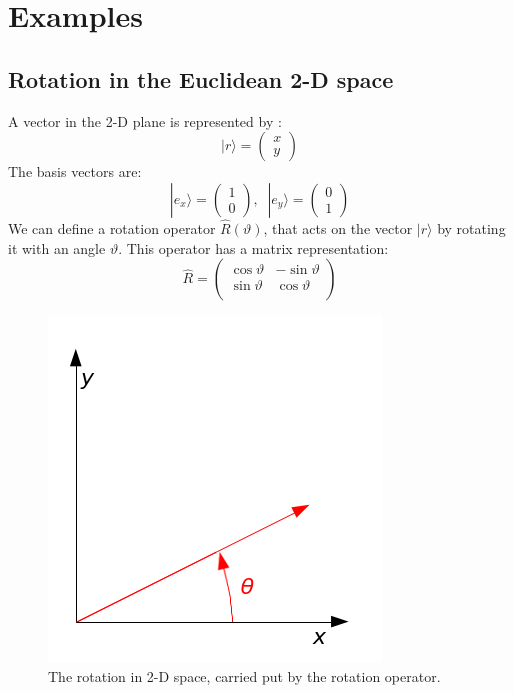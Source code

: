  \section{Examples}
 \subsection{ Rotation in the Euclidean 2-D space} 
 A vector in the 2-D plane is represented by :
 \begin{equation}
 | r \rangle = \left( \begin{array}{c}
 x \\ y
 \end{array}\right) 
 \end{equation}
 The basis vectors are:
 \begin{equation}
 | e_x\rangle = \left( \begin{array}{c}
 1 \\ 0
 \end{array}\right), \; \;  | e_y\rangle = \left( \begin{array}{c}
 0 \\ 1
 \end{array}\right)
 \end{equation}
 We can define a rotation operator $ \hat{R} ( \vartheta)$, that acts on the vector $  | r \rangle$ by rotating it with an angle $ \vartheta$. This operator has a matrix representation:
 \begin{equation}
 \hat{ R} =
 \begin{pmatrix}
 \cos \vartheta & -\sin \vartheta \\  
 \sin \vartheta & \cos \vartheta \\
 \end{pmatrix}
 \end{equation}
 \begin{figure}[h!]
 	\centering
 	\includegraphics[scale= 0.5]{./figures/rotation}
 	\caption{The rotation in 2-D space, carried put by the rotation operator.}
 	\label{fig:rotation}
 \end{figure}
